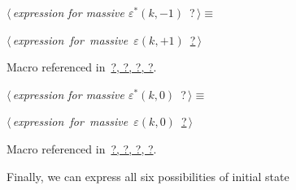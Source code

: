 \documentclass[a4paper,12pt]{amsart}
\renewcommand{\NWtarget}[2]{\hypertarget{#1}{#2}}
\renewcommand{\NWlink}[2]{\hyperlink{#1}{#2}}
\renewcommand{\NWtxtMacroRefIn}{Macro referenced in}
\renewcommand{\NWsep}{${\diamond}$}
\begin{document}
\begin{flushleft} \small
\begin{minipage}{\linewidth}\label{scrap28}\raggedright\small
\NWtarget{nuweb?}{} $\langle\,${\it expression for massive $\varepsilon^\ast(k, -1)$}\nobreak\ {\footnotesize {?}}$\,\rangle\equiv$
\vspace{-1ex}
\begin{list}{}{} \item
\mbox{}\verb@@\hbox{$\langle\,${\it expression for massive $\varepsilon(k, +1)$}\nobreak\ {\footnotesize \NWlink{nuweb?}{?}}$\,\rangle$}\verb@@{\NWsep}
\end{list}
\vspace{-1.5ex}
\footnotesize
\begin{list}{}{\setlength{\itemsep}{-\parsep}\setlength{\itemindent}{-\leftmargin}}
\item \NWtxtMacroRefIn\ \NWlink{nuweb?}{?}\NWlink{nuweb?}{, ?}\NWlink{nuweb?}{, ?}\NWlink{nuweb?}{, ?}.

\item{}
\end{list}
\end{minipage}\vspace{4ex}
\end{flushleft}
\begin{flushleft} \small
\begin{minipage}{\linewidth}\label{scrap29}\raggedright\small
\NWtarget{nuweb?}{} $\langle\,${\it expression for massive $\varepsilon^\ast(k, 0)$}\nobreak\ {\footnotesize {?}}$\,\rangle\equiv$
\vspace{-1ex}
\begin{list}{}{} \item
\mbox{}\verb@@\hbox{$\langle\,${\it expression for massive $\varepsilon(k, 0)$}\nobreak\ {\footnotesize \NWlink{nuweb?}{?}}$\,\rangle$}\verb@@{\NWsep}
\end{list}
\vspace{-1.5ex}
\footnotesize
\begin{list}{}{\setlength{\itemsep}{-\parsep}\setlength{\itemindent}{-\leftmargin}}
\item \NWtxtMacroRefIn\ \NWlink{nuweb?}{?}\NWlink{nuweb?}{, ?}\NWlink{nuweb?}{, ?}\NWlink{nuweb?}{, ?}.

\item{}
\end{list}
\end{minipage}\vspace{4ex}
\end{flushleft}
Finally, we can express all six possibilities of initial state
\end{document}
